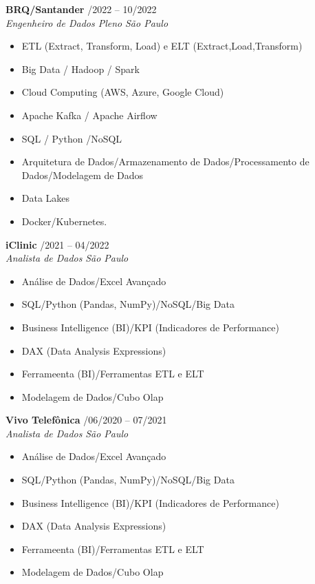 \documentclass[a4paper,10pt]{article}
\newcommand{\entry}[4]{
  \noindent \textbf{#1} \hfill #2 \\
  \noindent \textit{#3} \hfill \textit{#4} \\
  \vspace{2pt}
}
\begin{document}
\entry{BRQ/Santander}{\faCalendar {}/2022 -- 10/2022 \textbf}{Engenheiro de Dados Pleno}{\faMapMarker \space São Paulo}
\vspace{-1.6em}
\begin{itemize}
\setlength\itemsep{-0.3em}
\item ETL (Extract, Transform, Load) e ELT 
(Extract,Load,Transform)
\item Big Data / Hadoop / Spark
\item Cloud Computing (AWS, Azure, Google Cloud)
\item Apache Kafka / Apache Airflow
\item SQL / Python /NoSQL
\item Arquitetura de Dados/Armazenamento de Dados/Processamento de Dados/Modelagem de Dados
\item Data Lakes
\item Docker/Kubernetes.
\end{itemize}

\entry{iClinic}{\faCalendar {}/2021 -- 04/2022 \textbf}{Analista de Dados }{\faMapMarker \space São Paulo}
\vspace{-1.6em}
\begin{itemize}
\setlength\itemsep{-0.3em}
\item Análise de Dados/Excel Avançado
\item SQL/Python (Pandas, NumPy)/NoSQL/Big Data
\item Business Intelligence (BI)/KPI (Indicadores de Performance)
\item DAX (Data Analysis Expressions)
\item Ferrameenta (BI)/Ferramentas ETL e ELT
\item Modelagem de Dados/Cubo Olap
\end{itemize}

\entry{Vivo Telefônica}{\faCalendar \space /06/2020 --  07/2021  \textbf}{Analista de Dados }{\faMapMarker \space São Paulo}
\vspace{-1.6em}
\begin{itemize}
\setlength\itemsep{-0.3em}
\item Análise de Dados/Excel Avançado
\item SQL/Python (Pandas, NumPy)/NoSQL/Big Data
\item Business Intelligence (BI)/KPI (Indicadores de Performance)
\item DAX (Data Analysis Expressions)
\item Ferrameenta (BI)/Ferramentas ETL e ELT
\item Modelagem de Dados/Cubo Olap
\end{itemize}
\end{document}
